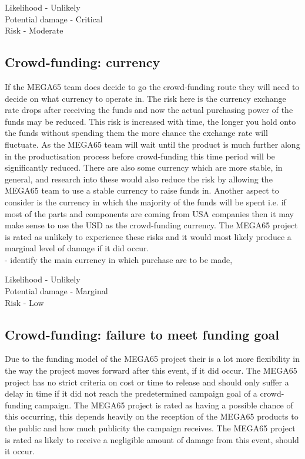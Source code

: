 Likelihood - Unlikely \\
Potential damage - Critical \\
Risk - Moderate \\


\subsection{Crowd-funding: currency}
If the MEGA65 team does decide to go the crowd-funding route they will need to decide on what currency to operate in. The risk here is the currency exchange rate drops after receiving the funds and now the actual purchasing power of the funds may be reduced. This risk is increased with time, the longer you hold onto the funds without spending them the more chance the exchange rate will fluctuate. As the MEGA65 team will wait until the product is much further along in the productisation process before crowd-funding this time period will be significantly reduced. There are also some currency which are more stable, in general, and research into these would also reduce the risk by allowing the MEGA65 team to use a stable currency to raise funds in. Another aspect to consider is the currency in which the majority of the funds will be spent i.e. if most of the parts and components are coming from USA companies then it may make sense to use the USD as the crowd-funding currency. The MEGA65 project is rated as unlikely to experience these risks and it would most likely produce a marginal level of damage if it did occur. \\

- identify the main currency in which purchase are to be made, 

Likelihood - Unlikely \\
Potential damage - Marginal \\
Risk - Low \\


\subsection{Crowd-funding: failure to meet funding goal}
Due to the funding model of the MEGA65 project their is a lot more flexibility in the way the project moves forward after this event, if it did occur. The MEGA65 project has no strict criteria on cost or time to release and should only suffer a delay in time if it did not reach the predetermined campaign goal of a crowd-funding campaign. The MEGA65 project is rated as having a possible chance of this occurring, this depends heavily on the reception of the MEGA65 products to the public and how much publicity the campaign receives. The MEGA65 project is rated as likely to receive a negligible amount of damage from this event, should it occur. \\

